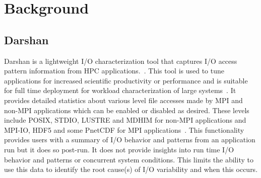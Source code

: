\section{Background}
\label{sec:background}
\subsection{Darshan}
Darshan is a lightweight I/O characterization tool that captures I/O access pattern information from HPC applications.~\cite{Darshan}.
This tool is used to tune applications for increased scientific productivity or performance and is suitable for full time deployment for workload characterization of large systems~\cite{darshan-webpage}. It provides detailed statistics about various level file accesses made by MPI and non-MPI applications which can be enabled or disabled as desired. These levels include POSIX, STDIO, LUSTRE and MDHIM for non-MPI applications and MPI-IO, HDF5 and some PnetCDF for MPI applications~\cite{darshan-runtime}. This functionality provides users with a summary of I/O behavior and patterns from an application run but it does so post-run. It does not provide insights into run time I/O behavior and patterns or concurrent system conditions. This limits the ability to use this data to identify the root cause(s) of I/O variability and when this occurs. 

